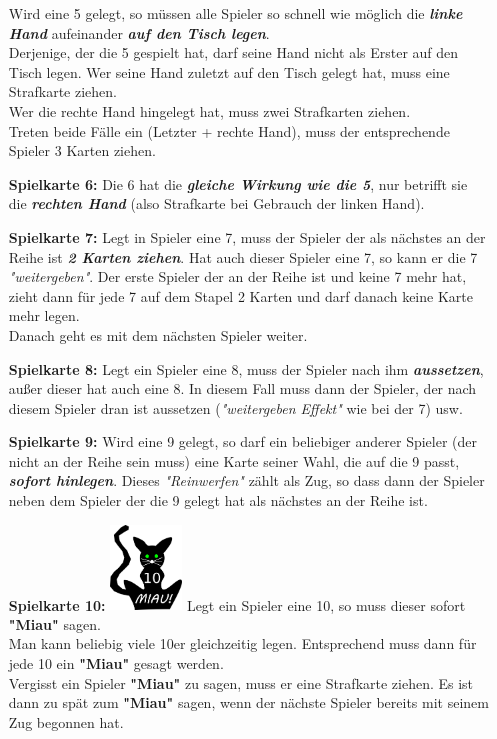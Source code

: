 \documentclass{article}
\begin{document}
\begin{itemize}
Wird eine 5 gelegt, so müssen alle Spieler so schnell wie möglich die \textit{\textbf{linke Hand}} aufeinander \textit{\textbf{auf den Tisch legen}}. \\
Derjenige, der die 5 gespielt hat, darf seine Hand nicht als Erster auf den Tisch legen. Wer seine Hand zuletzt auf den Tisch gelegt hat, muss eine Strafkarte ziehen. \\
Wer die rechte Hand hingelegt hat, muss zwei Strafkarten ziehen.\\ Treten beide Fälle ein (Letzter + rechte Hand), muss der entsprechende Spieler 3 Karten ziehen.
\item[\textbf{Spielkarte 6:}]
Die 6 hat die \textit{\textbf{gleiche Wirkung wie die 5}}, nur betrifft sie die \textit{\textbf{rechten Hand}} (also Strafkarte bei Gebrauch der linken Hand).
\item[\textbf{Spielkarte 7:}] 
Legt in Spieler eine 7, muss der Spieler der als nächstes an der Reihe ist \textit{\textbf{2 Karten ziehen}}. Hat auch dieser Spieler eine 7, so kann er die 7 \textit{"weitergeben"}. Der erste Spieler der an der Reihe ist und keine 7 mehr hat, zieht dann für jede 7 auf dem Stapel 2 Karten und darf danach keine Karte mehr legen. \\
Danach geht es mit dem nächsten Spieler weiter.
\item[\textbf{Spielkarte 8:}]
Legt ein Spieler eine 8, muss der Spieler nach ihm \textit{\textbf{aussetzen}}, außer dieser hat auch eine 8. In diesem Fall muss dann der Spieler, der nach diesem Spieler dran ist aussetzen (\textit{"weitergeben
Effekt"} wie bei der 7) usw.
\item[\textbf{Spielkarte 9:}]
Wird eine 9 gelegt, so darf ein beliebiger anderer Spieler (der nicht an der Reihe sein muss) eine Karte seiner Wahl, die auf die 9 passt, \textit{\textbf{sofort hinlegen}}. Dieses
\textit{"Reinwerfen"} zählt als Zug, so dass dann der Spieler neben dem Spieler der die 9 gelegt hat als nächstes an der Reihe ist.
\item[\textbf{Spielkarte 10:}]
\includegraphics[width=0.15\textwidth]{photos/cat.png}
Legt ein Spieler eine 10, so muss dieser sofort \textbf{"Miau"} sagen. \\
Man kann beliebig viele 10er gleichzeitig legen. Entsprechend muss dann für jede 10 ein \textbf{"Miau"} gesagt werden. \\ Vergisst ein Spieler \textbf{"Miau"} zu sagen, muss er eine Strafkarte ziehen. Es ist dann zu spät zum \textbf{"Miau"} sagen, wenn der nächste Spieler bereits mit seinem Zug begonnen hat.

\end{itemize}
\end{document}

